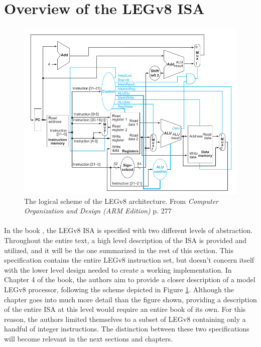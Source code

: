 \section{Overview of the LEGv8 ISA}

\begin{figure}[H]
	\centering
	\includegraphics[width=1\textwidth]{img/legv8_logical_scheme.png}
	\caption{The logical scheme of the LEGv8 architecture. From \emph{Computer Organization and Design (ARM Edition)} \cite{patterson2016computer} p. 277}
 \label{fig:legv8logicdiag}
\end{figure}

\paragraph{}
In the book \cite{patterson2016computer}, the LEGv8 ISA is specified with two different levels of abstraction. Throughout the entire text, a high level description of the ISA is provided and utilized, and it will be the one summarized in the rest of this section. This specification contains the entire LEGv8 instruction set, but doesn't concern itself with the lower level design needed to create a working implementation. In Chapter 4 of the book, the authors aim to provide a closer description of a model LEGv8 processor, following the scheme depicted in Figure \ref{fig:legv8logicdiag}. Although the chapter goes into much more detail than the figure shown, providing a description of the entire ISA at this level would require an entire book of its own. For this reason, the authors limited themselves to a subset of LEGv8 containing only a handful of integer instructions. The distinction between these two specifications will become relevant in the next sections and chapters.

